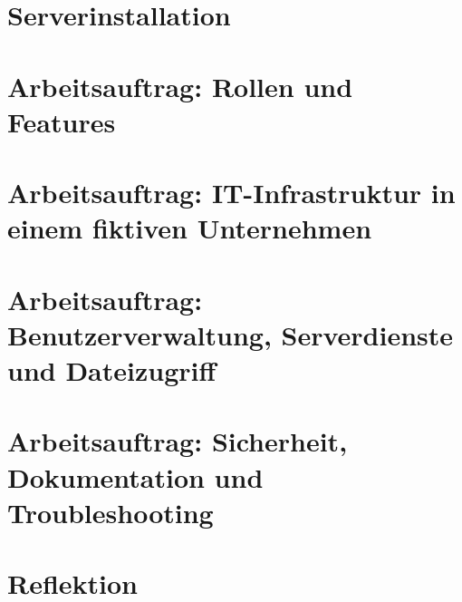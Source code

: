 \documentclass[a4paper,12pt]{article}
\begin{document}
    \section{Serverinstallation}\label{sec:serverinstallation}
    

    \section{Arbeitsauftrag: Rollen und Features}\label{sec:arbeitsauftrag_rollen_features}
    
    
    \section{Arbeitsauftrag: IT-Infrastruktur in einem fiktiven Unternehmen}\label{sec:arbeitsauftrag_it_infrastruktur}
    
    
    \section{Arbeitsauftrag: Benutzerverwaltung, Serverdienste und Dateizugriff}\label{sec:arbeitsauftrag:-benutzerverwaltung-serverdienste-und-dateizugriff}
    

    \section{Arbeitsauftrag: Sicherheit, Dokumentation und Troubleshooting}\label{sec:arbeitsauftrag:-sicherheit-dokumentation-und-troubleshooting}
    

    \section{Reflektion}\label{sec:reflektion}
    

\newpage
\printbibliography[title={Literaturverzeichnis}]
\end{document}
